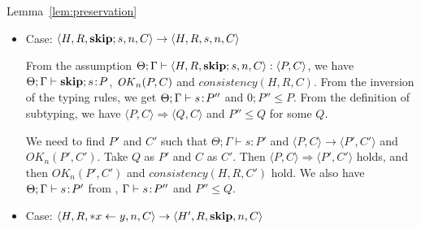 \begin{pfof}{Lemma~\ref{lem:preservation}}
\begin{itemize}
  We need to find \(P'\) and \(C'\) such that \(\exists \Gamma'\)
  s.t. \(\Theta; \Gamma' \vdash [x'/x]s\COL P'\), \( \langle P, C
  \rangle \xLongrightarrow{\Malloc} \langle P', C' \rangle\),
  \(consistency(H', R', C')\), \(OK_{n-1}(P', C')\) and \(\Gamma'
  \subseteq \DOM(R\set{x' \mapsto l})\). Take \(Q\) as \(P'\), \(C\)
  as \(C'\) and \(\Gamma,x'\) as \(\Gamma'\).  Then \( \langle P, C
  \rangle \xLongrightarrow{\Malloc} \langle P', C' \rangle\) and
  \(\Gamma' \subseteq \DOM(R\set{x' \mapsto l})\) hold, and then
  \(OK_{n-1}(P', C')\) and \(consistency(H\set{l\mapsto v}, R\set{x'
    \mapsto l}, C)\) hold by Lemma~\ref{lem:okPreserved} and
  Lemma~\ref{lem:consistency}. From \(\Theta; \Gamma, x \vdash s :
  P''\) and \( \Malloc;(x)P'' \le P\), by replacing \(x\) with
  \(x''\), we have \(\Theta; \Gamma, x'' \vdash [x''/x]s :
         [x''/x]P''\) and \( \Malloc;[x''/x]P'' \le P\), and then by the
         definition of subtyping we have \([x''/x]P'' \le Q'\) for
         some \(Q'\). Therefore, we get \(\Theta; \Gamma, x'' \vdash
         [x''/x]s : Q'\). Take \(x''\) as \(x'\) and \(Q'\) as \(P'\),
         then \(\Theta;\Gamma, x' \vdash [x'/x]s\COL P'\) holds.
      
\item Case: \( \langle H, R, \mathbf{skip};s, n, C \rangle \rightarrow \langle
  H, R, s, n, C \rangle \)

  From the assumption \( \Theta; \Gamma \vdash \langle H, R, \mathbf{skip};s,
  n, C \rangle : \langle P, C \rangle\), we have \(\Theta;\Gamma
  \vdash \mathbf{skip};s\!:\! P\), \(\mathit{OK}_{n}(P, C)\) and \(consistency(H, R,
  C)\). From the inversion of the typing rules, we get \(\Theta;
  \Gamma \vdash s\!:\! P''\) and \(0;P'' \le P\). From the definition
  of subtyping, we have \( \langle P, C \rangle \Longrightarrow
  \langle Q, C \rangle\) and \(P'' \le Q\) for some \(Q\).

  We need to find \(P'\) and \(C'\) such that \(\Theta; \Gamma \vdash
  s : P'\) and \(\langle P, C \rangle \rightarrow \langle P', C'
  \rangle\) and \(OK_n(P', C')\). Take \(Q\) as \(P'\) and \(C\) as
  \(C'\). Then \(\langle P, C\rangle \Longrightarrow \langle P', C'
  \rangle\) holds, and then \(OK_n(P', C')\) and \(consistency(H, R,
  C')\) hold. We also have \(\Theta;\Gamma \vdash s\!:\! P'\) from
  , \(\Gamma \vdash s\!:\! P''\) and \(P'' \le Q\).

\item Case: \( \langle H, R, *x \leftarrow y , n, C\rangle \rightarrow
  \langle H', R, \mathbf{skip}, n, C\rangle \)


\end{itemize}
\end{pfof}
